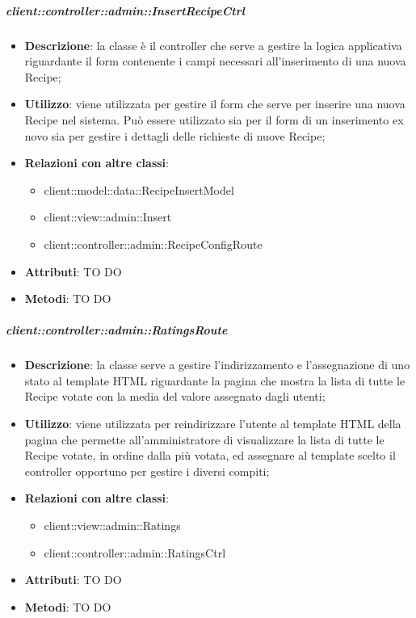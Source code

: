 		\subparagraph{client::controller::admin::InsertRecipeCtrl} %
		\label{subp:bdsm_app_client_controller_admin_insertctrl}
			\begin{itemize}
				\item \textbf{Descrizione}: la classe è il controller che serve a gestire la logica applicativa riguardante il form contenente i campi necessari all'inserimento di una nuova Recipe;
				\item \textbf{Utilizzo}: viene utilizzata per gestire il form che serve per inserire una nuova Recipe nel sistema. Può essere utilizzato sia per il form di un inserimento ex novo sia per gestire i dettagli delle richieste di nuove Recipe;
				\item \textbf{Relazioni con altre classi}:
					\begin{itemize}
						\item client::model::data::RecipeInsertModel
						\item client::view::admin::Insert
						\item client::controller::admin::RecipeConfigRoute
					\end{itemize}
				\item \textbf{Attributi}: TO DO
				\item \textbf{Metodi}: TO DO
			\end{itemize}

		\subparagraph{client::controller::admin::RatingsRoute} %
		\label{subp:bdsm_app_client_controller_admin_ratingsroute}
			\begin{itemize}
				\item \textbf{Descrizione}: la classe serve a gestire l'indirizzamento e l'assegnazione di uno stato al template HTML riguardante la pagina che mostra la lista di tutte le Recipe votate con la media del valore assegnato dagli utenti;
				\item \textbf{Utilizzo}: viene utilizzata per reindirizzare l'utente al template HTML della pagina che permette all'amministratore di visualizzare la lista di tutte le Recipe votate, in ordine dalla più votata, ed assegnare al template scelto il controller opportuno per gestire i diversi compiti;
				\item \textbf{Relazioni con altre classi}:
					\begin{itemize}
						\item client::view::admin::Ratings
						\item client::controller::admin::RatingsCtrl
					\end{itemize}
				\item \textbf{Attributi}: TO DO
				\item \textbf{Metodi}: TO DO
			\end{itemize}

